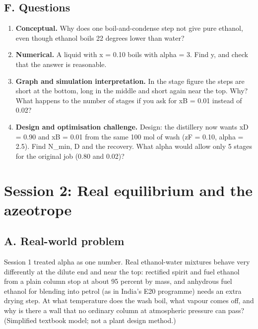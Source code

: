 \documentclass[11pt,a4paper]{article}
\begin{document}
\subsection*{F. Questions}
\begin{enumerate}[nosep]
\item \textbf{Conceptual.} Why does one boil-and-condense step not give pure ethanol, even though ethanol boils 22 degrees lower than water?
\item \textbf{Numerical.} A liquid with x = 0.10 boils with alpha = 3. Find y, and check that the answer is reasonable.
\item \textbf{Graph and simulation interpretation.} In the stage figure the steps are short at the bottom, long in the middle and short again near the top. Why? What happens to the number of stages if you ask for xB = 0.01 instead of 0.02?
\item \textbf{Design and optimisation challenge.} Design: the distillery now wants xD = 0.90 and xB = 0.01 from the same 100 mol of wash (zF = 0.10, alpha = 2.5). Find N\_min, D and the recovery. What alpha would allow only 5 stages for the original job (0.80 and 0.02)?
\end{enumerate}

\section{Session 2: Real equilibrium and the azeotrope}

\subsection*{A. Real-world problem}
Session 1 treated alpha as one number. Real ethanol-water mixtures behave very differently at the dilute end and near the top: rectified spirit and fuel ethanol from a plain column stop at about 95 percent by mass, and anhydrous fuel ethanol for blending into petrol (as in India's E20 programme) needs an extra drying step. At what temperature does the wash boil, what vapour comes off, and why is there a wall that no ordinary column at atmospheric pressure can pass? (Simplified textbook model; not a plant design method.)
\end{document}
